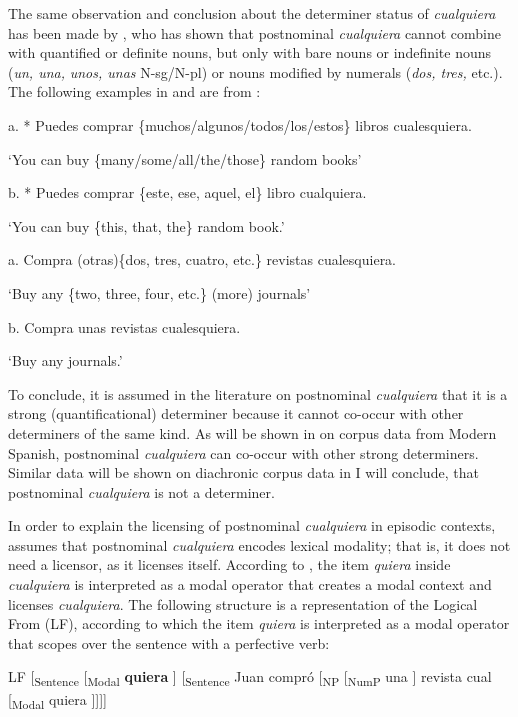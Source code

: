 \documentclass[output=paper]{langscibook}
\begin{document}
  The same observation and conclusion about the determiner status of \textit{cualquiera} has been made by \citet{Rivero2011}, who has shown that postnominal \textit{cualquiera} cannot combine with quantified or definite nouns, but only with bare nouns or indefinite nouns (\textit{un, una,} \textit{unos, unas} N-sg/N-pl) or nouns modified by numerals (\textit{dos, tres,} etc.). The following examples in  and  are from \citet[72]{Rivero2011}:

\label{bkm:Ref63458156}  a.  * Puedes comprar \{muchos/algunos/todos/los/estos\} libros cualesquiera.

    ‘You can buy \{many/some/all/the/those\} random books’

  b.  * Puedes comprar \{este, ese, aquel, el\} libro cualquiera.

    ‘You can buy \{this, that, the\} random book.’

\label{bkm:Ref533762162}  a.  Compra (otras)\{dos, tres, cuatro, etc.\} revistas cualesquiera.

    ‘Buy any \{two, three, four, etc.\} (more) journals’

  b.  Compra unas revistas cualesquiera.

    ‘Buy any journals.’

To conclude, it is assumed in the literature on postnominal \textit{cualquiera} that it is a strong (quantificational) determiner because it cannot co-occur with other determiners of the same kind. As will be shown in  on corpus data from Modern Spanish, postnominal \textit{cualquiera} can co-occur with other strong determiners. Similar data will be shown on diachronic corpus data in  I will conclude, that postnominal \textit{cualquiera} is not a determiner. 

  In order to explain the licensing of postnominal \textit{cualquiera} in episodic contexts, \citet{Rivero2011} assumes that postnominal \textit{cualquiera} encodes lexical modality; that is, it does not need a licensor, as it licenses itself. According to \citet{Rivero2011}, the item \textit{quiera} inside \textit{cualquiera} is interpreted as a modal operator that creates a modal context and licenses \textit{cualquiera}. The following structure is a representation of the Logical From (LF), according to which the item \textit{quiera} is interpreted as a modal operator that scopes over the sentence with a perfective verb:

  LF [\textsubscript{Sentence} [\textsubscript{Modal} \textbf{quiera} ] [\textsubscript{Sentence} Juan compró [\textsubscript{NP} [\textsubscript{NumP} una ] revista cual [\textsubscript{Modal} quiera ]]]]
\end{document}
